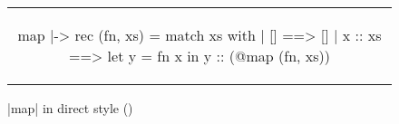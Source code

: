 \begin{figure}[tp]
\begin{tabular}{c}
\begin{Datalang}
map |-> rec (fn, xs) =
  match xs with
  | [] ==> 
      []
  | x :: xs ==>
      let y = fn x in
      y :: (@map (fn, xs))
\end{Datalang}
\end{tabular}
\caption{\datalang|map| in direct style (\DataLang)}
\label{fig:map}
\end{figure}